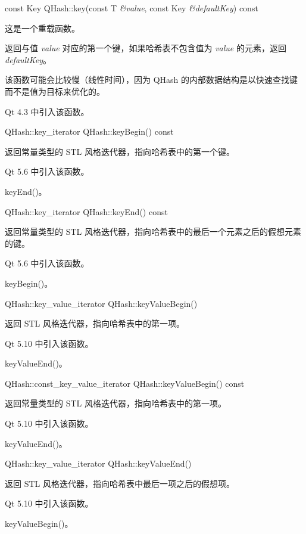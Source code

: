 const Key QHash::key(const T \emph{\&value}, const Key \emph{\&defaultKey}) const

这是一个重载函数。

返回与值 \emph{value} 对应的第一个键，如果哈希表不包含值为 \emph{value} 的元素，返回 \emph{defaultKey}。

该函数可能会比较慢（线性时间），因为 QHash 的内部数据结构是以快速查找键而不是值为目标来优化的。

Qt 4.3 中引入该函数。

QHash::key\_iterator QHash::keyBegin() const

返回常量类型的 STL 风格迭代器，指向哈希表中的第一个键。

Qt 5.6 中引入该函数。

\begin{notice}[另请参阅]
 keyEnd()。
\end{notice}

QHash::key\_iterator QHash::keyEnd() const

返回常量类型的 STL 风格迭代器，指向哈希表中的最后一个元素之后的假想元素的键。

Qt 5.6 中引入该函数。

\begin{notice}[另请参阅]
keyBegin()。
\end{notice}

QHash::key\_value\_iterator QHash::keyValueBegin()

返回 STL 风格迭代器，指向哈希表中的第一项。

Qt 5.10 中引入该函数。

\begin{notice}[另请参阅]
 keyValueEnd()。
\end{notice}


QHash::const\_key\_value\_iterator QHash::keyValueBegin() const

返回常量类型的 STL 风格迭代器，指向哈希表中的第一项。

Qt 5.10 中引入该函数。

\begin{notice}[另请参阅]
 keyValueEnd()。
\end{notice}

QHash::key\_value\_iterator QHash::keyValueEnd()

返回 STL 风格迭代器，指向哈希表中最后一项之后的假想项。

Qt 5.10 中引入该函数。

\begin{notice}[另请参阅]
keyValueBegin()。
\end{notice}


